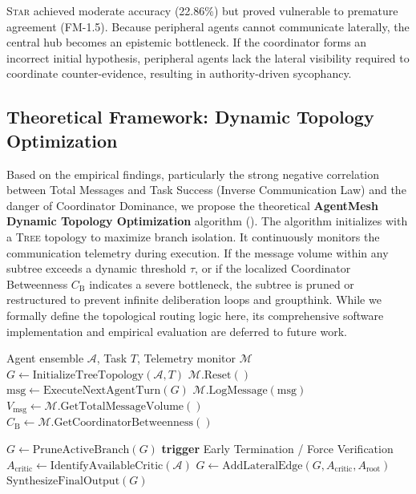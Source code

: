 \documentclass[conference]{IEEEtran}
\newcommand{\CB}{C_{\mathrm{B}}}    %
\newcommand{\topo}[1]{\textsc{#1}}  %
\newcommand{\fm}[1]{\textsf{FM-#1}} %
\begin{document}
\topo{Star} achieved moderate accuracy (22.86\%) but proved vulnerable to premature agreement (\fm{1.5}). Because peripheral agents cannot communicate laterally, the central hub becomes an epistemic bottleneck. If the coordinator forms an incorrect initial hypothesis, peripheral agents lack the lateral visibility required to coordinate counter-evidence, resulting in authority-driven sycophancy.

\subsection{Theoretical Framework: Dynamic Topology Optimization}
\label{sec:algorithm}

Based on the empirical findings, particularly the strong negative correlation between Total Messages and Task Success (Inverse Communication Law) and the danger of Coordinator Dominance, we propose the theoretical \textbf{AgentMesh Dynamic Topology Optimization} algorithm (). The algorithm initializes with a \topo{Tree} topology to maximize branch isolation. It continuously monitors the communication telemetry during execution. If the message volume within any subtree exceeds a dynamic threshold $\tau$, or if the localized Coordinator Betweenness $\CB$ indicates a severe bottleneck, the subtree is pruned or restructured to prevent infinite deliberation loops and groupthink. While we formally define the topological routing logic here, its comprehensive software implementation and empirical evaluation are deferred to future work.

\begin{algorithm}[!t]
\caption{AgentMesh Dynamic Topology Optimization}
\label{alg:dynamic_topo}
\begin{algorithmic}[1]
\Require Agent ensemble $\mathcal{A}$, Task $T$, Telemetry monitor $\mathcal{M}$
\State $G \gets \text{InitializeTreeTopology}(\mathcal{A}, T)$ 
\State $\mathcal{M}.\text{Reset}()$
    \State $\text{msg} \gets \text{ExecuteNextAgentTurn}(G)$
    \State $\mathcal{M}.\text{LogMessage}(\text{msg})$
    \State $V_{\text{msg}} \gets \mathcal{M}.\text{GetTotalMessageVolume}()$
    \State $\CB \gets \mathcal{M}.\text{GetCoordinatorBetweenness}()$
    
     
        \State $G \gets \text{PruneActiveBranch}(G)$
        \State \textbf{trigger} Early Termination / Force Verification
    \ElsIf{$\CB > \tau_{\text{dom}}$} 
        \State $A_{\text{critic}} \gets \text{IdentifyAvailableCritic}(\mathcal{A})$
        \State $G \gets \text{AddLateralEdge}(G, A_{\text{critic}}, A_{\text{root}})$
    \EndIf
\EndWhile
\State \Return $\text{SynthesizeFinalOutput}(G)$
\end{algorithmic}
\end{algorithm}
\end{document}
